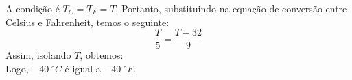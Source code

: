 %
%
	A condição é $T_{C}=T_{F}=T$. Portanto, substituindo na equação de conversão entre Celsius e Fahrenheit, temos o seguinte: \[\dfrac{T}{5}=\dfrac{T-32}{9}\] Assim, isolando $T$, obtemos: \\
	Logo, $-40\;^\circ C$ é igual a $-40\;^\circ F$.
